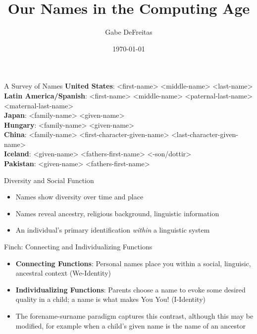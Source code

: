 \documentclass{beamer}
\title{Our Names in the Computing Age}
\date{\today}
\author{Gabe DeFreitas}
\begin{document}
\maketitle

\begin{frame}{A Survey of Names}
\textbf{United States}: <first-name> <middle-name> <last-name> \\
\textbf{Latin America/Spanish}: <first-name> <middle-name> <paternal-last-name>
<maternal-last-name> \\
\textbf{Japan}: <family-name> <given-name> \\
\textbf{Hungary}: <family-name> <given-name> \\
\textbf{China}: <family-name> <first-character-given-name> <last-character-given-name> \\
\textbf{Iceland}: <given-name> <fathers-first-name> <-son/dottir> \\
\textbf{Pakistan}: <given-name> <fathers-first-name> \\
\end{frame}

\begin{frame}{Diversity and Social Function}
\begin{itemize}
\item Names show diversity over time and place
\item Names reveal ancestry, religious background, linguistic information
\item An individual's primary identification \textit{within} a linguistic
  system
\end{itemize}
\end{frame}

\begin{frame}{Finch: Connecting and Individualizing Functions \parencite{finch08}}
\begin{itemize}
\item \textbf{Connecting Functions}: Personal names place you within a social,
linguisic, ancestral context (We-Identity)
\item \textbf{Individualizing Functions}: Parents choose a name to evoke some
desired quality in a child; a name is what makes You You! (I-Identity)
\item The forename-surname paradigm captures this contrast, although this may be
modified, for example when a child's given name is the name of an ancestor
\end{itemize}
\end{frame}
\end{document}
